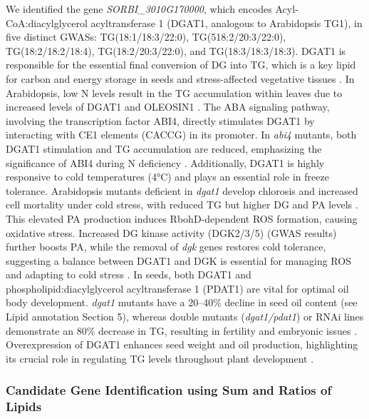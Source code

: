 \documentclass[10pt,letterpaper]{article}
\begin{document}
\begin{itemize}
We identified the gene \textit{SORBI\_3010G170000}, which encodes Acyl‐CoA:diacylglycerol acyltransferase 1 (DGAT1, analogous to Arabidopsis TG1), in five distinct GWASs: TG(18:1/18:3/22:0), TG(518:2/20:3/22:0), TG(18:2/18:2/18:4), TG(18:2/20:3/22:0), and TG(18:3/18:3/18:3). DGAT1 is responsible for the essential final conversion of DG into TG, which is a key lipid for carbon and energy storage in seeds and stress-affected vegetative tissues \cite{Zhang2009,Yang2011}. In Arabidopsis, low N levels result in the TG accumulation within leaves due to increased levels of DGAT1 and OLEOSIN1 \cite{Yang2011}. The ABA signaling pathway, involving the transcription factor ABI4, directly stimulates DGAT1 by interacting with CE1 elements (CACCG) in its promoter. In \emph{abi4} mutants, both DGAT1 stimulation and TG accumulation are reduced, emphasizing the significance of ABI4 during N deficiency \cite{Yang2011}. Additionally, DGAT1 is highly responsive to cold temperatures (4°C) and plays an essential role in freeze tolerance. Arabidopsis mutants deficient in \emph{dgat1} develop chlorosis and increased cell mortality under cold stress, with reduced TG but higher DG and PA levels \cite{Tan2018}. This elevated PA production induces RbohD-dependent ROS formation, causing oxidative stress. Increased DG kinase activity (DGK2/3/5) (GWAS results) further boosts PA, while the removal of \emph{dgk} genes restores cold tolerance, suggesting a balance between DGAT1 and DGK is essential for managing ROS and adapting to cold stress \cite{Tan2018}. In seeds, both DGAT1 and phospholipid:diacylglycerol acyltransferase 1 (PDAT1) are vital for optimal oil body development. \emph{dgat1} mutants have a 20–40\% decline in seed oil content (see Lipid annotation Section 5), whereas double mutants (\emph{dgat1/pdat1}) or RNAi lines demonstrate an 80\% decrease in TG, resulting in fertility and embryonic issues \cite{Zhang2009}. Overexpression of DGAT1 enhances seed weight and oil production, highlighting its crucial role in regulating TG levels throughout plant development \cite{Zhang2009,Yang2011}.



\subsubsection*{Candidate Gene Identification using Sum and Ratios of Lipids}

\end{itemize}
\end{document}
